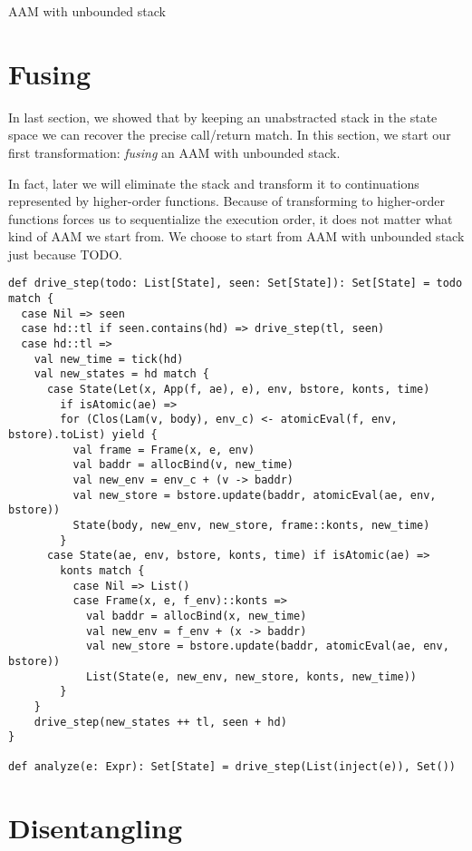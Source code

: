 \documentclass[acmsmall,review,anonymous]{acmart}\settopmatter{printfolios=true,printccs=false,printacmref=false}
\begin{document}
AAM with unbounded stack

\section{Fusing} \label{fusing}

In last section, we showed that by keeping an unabstracted stack in the state 
space we can recover the precise call/return match. In this section, we start
our first transformation: \textit{fusing} an AAM with unbounded stack.

In fact, later we will eliminate the stack and transform it to continuations
represented by higher-order functions.
Because of transforming to higher-order functions forces us to sequentialize the execution order,
it does not matter what kind of AAM we start from. 
We choose to start from AAM with unbounded stack just because TODO.

\begin{lstlisting}
def drive_step(todo: List[State], seen: Set[State]): Set[State] = todo match {
  case Nil => seen
  case hd::tl if seen.contains(hd) => drive_step(tl, seen)
  case hd::tl =>
    val new_time = tick(hd)
    val new_states = hd match {
      case State(Let(x, App(f, ae), e), env, bstore, konts, time) 
        if isAtomic(ae) =>
        for (Clos(Lam(v, body), env_c) <- atomicEval(f, env, bstore).toList) yield {
          val frame = Frame(x, e, env)
          val baddr = allocBind(v, new_time)
          val new_env = env_c + (v -> baddr)
          val new_store = bstore.update(baddr, atomicEval(ae, env, bstore))
          State(body, new_env, new_store, frame::konts, new_time)
        }
      case State(ae, env, bstore, konts, time) if isAtomic(ae) =>
        konts match {
          case Nil => List()
          case Frame(x, e, f_env)::konts =>
            val baddr = allocBind(x, new_time)
            val new_env = f_env + (x -> baddr)
            val new_store = bstore.update(baddr, atomicEval(ae, env, bstore))
            List(State(e, new_env, new_store, konts, new_time))
        }
    }
    drive_step(new_states ++ tl, seen + hd)
}

def analyze(e: Expr): Set[State] = drive_step(List(inject(e)), Set())
\end{lstlisting}

\section{Disentangling} \label{disen}
\end{document}
